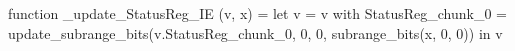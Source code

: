 function _update_StatusReg_IE (v, x) = let v = { v with StatusReg_chunk_0 = update_subrange_bits(v.StatusReg_chunk_0, 0, 0, subrange_bits(x, 0, 0)) } in
  v
